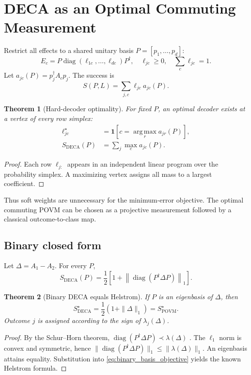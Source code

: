 \documentclass[10pt,twocolumn]{article}
\newtheorem{theorem}{Theorem}
\theoremstyle{definition}
\theoremstyle{remark}
\newcommand{\diag}{\operatorname{diag}}
\newcommand{\argmax}{\operatorname*{arg\,max}}
\begin{document}
\section{DECA as an Optimal Commuting Measurement}
\label{sec:theory}

Restrict all effects to a shared unitary basis
$P=[p_1,\ldots,p_d]$:
\begin{equation}
  E_c=P\diag(\ell_{1c},\ldots,\ell_{dc})P^\dagger,
  \quad
  \ell_{jc}\ge0,\quad\sum_c\ell_{jc}=1.
  \label{eq:commuting_effect}
\end{equation}
Let $a_{jc}(P)=p_j^\dagger A_cp_j$.  The success is
\begin{equation}
  S(P,L)=\sum_{j,c}\ell_{jc}a_{jc}(P).
\end{equation}

\begin{theorem}[Hard-decoder optimality]
\label{thm:hard_decoder}
For fixed $P$, an optimal decoder exists at a vertex of every row simplex:
\begin{align}
  \ell_{jc}^\star
  &=\bm{1}\!\left[c=\argmax_r a_{jr}(P)\right],
  \nonumber\\
  S_{\mathrm{DECA}}(P)
  &=\sum_j\max_c a_{jc}(P).
  \label{eq:deca_objective}
\end{align}
\end{theorem}
\begin{proof}
Each row $\ell_{j:}$ appears in an independent linear program over the
probability simplex.  A maximizing vertex assigns all mass to a largest
coefficient.
\end{proof}

Thus soft weights are unnecessary for the minimum-error objective.  The
optimal commuting POVM can be chosen as a projective measurement followed by
a classical outcome-to-class map.

\subsection{Binary closed form}

Let $\Delta=A_1-A_2$.  For every $P$,
\begin{equation}
S_{\mathrm{DECA}}(P)
=\frac12\left[
1+\left\|\diag(P^\dagger\Delta P)\right\|_1
\right].
\label{eq:binary_basis_objective}
\end{equation}

\begin{theorem}[Binary DECA equals Helstrom]
\label{thm:binary}
If $P$ is an eigenbasis of $\Delta$, then
\begin{equation}
  S_{\mathrm{DECA}}^\star
  =\frac12(1+\|\Delta\|_1)
  =S_{\mathrm{POVM}}^\star.
  \label{eq:helstrom}
\end{equation}
Outcome $j$ is assigned according to the sign of
$\lambda_j(\Delta)$.
\end{theorem}
\begin{proof}
By the Schur--Horn theorem,
$\diag(P^\dagger\Delta P)\prec\lambda(\Delta)$
\cite{bhatia1997}.  The $\ell_1$ norm is convex and symmetric, hence
$\|\diag(P^\dagger\Delta P)\|_1\le\|\lambda(\Delta)\|_1$.
An eigenbasis attains equality.  Substitution into
\cref{eq:binary_basis_objective} yields the known Helstrom formula.
\end{proof}
\end{document}
